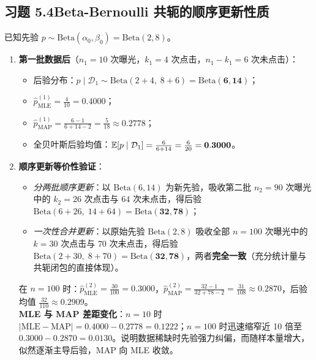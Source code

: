 \subsection*{习题 5.4\quad Beta-Bernoulli 共轭的顺序更新性质}
已知先验 $p \sim \mathrm{Beta}(\alpha_0, \beta_0) = \mathrm{Beta}(2, 8)$。
\begin{enumerate}[label=(\alph*), leftmargin=1.8em]
  \item \textbf{第一批数据后}（$n_1 = 10$ 次曝光，$k_1 = 4$ 次点击，$n_1 - k_1 = 6$ 次未点击）：
  \begin{itemize}
    \item 后验分布：$p \mid \mathcal{D}_1 \sim \mathrm{Beta}(2 + 4,\; 8 + 6) = \mathbf{\mathrm{Beta}(6, 14)}$；
    \item $\hat{p}_{\mathrm{MLE}}^{(1)} = \frac{4}{10} = \mathbf{0.4000}$；
    \item $\hat{p}_{\mathrm{MAP}}^{(1)} = \frac{6 - 1}{6 + 14 - 2} = \frac{5}{18} \approx \mathbf{0.2778}$；
    \item 全贝叶斯后验均值：$\mathbb{E}[p \mid \mathcal{D}_1] = \frac{6}{6 + 14} = \frac{6}{20} = \mathbf{0.3000}$。
  \end{itemize}
  \item \textbf{顺序更新等价性验证}：
  \begin{itemize}
    \item \emph{分两批顺序更新}：以 $\mathrm{Beta}(6, 14)$ 为新先验，吸收第二批 $n_2 = 90$ 次曝光中的 $k_2 = 26$ 次点击与 $64$ 次未点击，得后验 $\mathrm{Beta}(6 + 26,\; 14 + 64) = \mathbf{\mathrm{Beta}(32, 78)}$；
    \item \emph{一次性合并更新}：以原始先验 $\mathrm{Beta}(2, 8)$ 吸收全部 $n = 100$ 次曝光中的 $k = 30$ 次点击与 $70$ 次未点击，得后验 $\mathrm{Beta}(2 + 30,\; 8 + 70) = \mathbf{\mathrm{Beta}(32, 78)}$，两者\textbf{完全一致}（充分统计量与共轭闭包的直接体现）。
  \end{itemize}
  在 $n = 100$ 时：$\hat{p}_{\mathrm{MLE}}^{(2)} = \frac{30}{100} = \mathbf{0.3000}$，$\hat{p}_{\mathrm{MAP}}^{(2)} = \frac{32 - 1}{32 + 78 - 2} = \frac{31}{108} \approx \mathbf{0.2870}$，后验均值 $\frac{32}{110} \approx \mathbf{0.2909}$。\\
  \textbf{MLE 与 MAP 差距变化}：$n=10$ 时 $|\text{MLE} - \text{MAP}| = 0.4000 - 0.2778 = \mathbf{0.1222}$；$n=100$ 时迅速缩窄近 10 倍至 $0.3000 - 0.2870 = \mathbf{0.0130}$。说明数据稀缺时先验强力纠偏，而随样本量增大，似然逐渐主导后验，MAP 向 MLE 收敛。
\end{enumerate}

